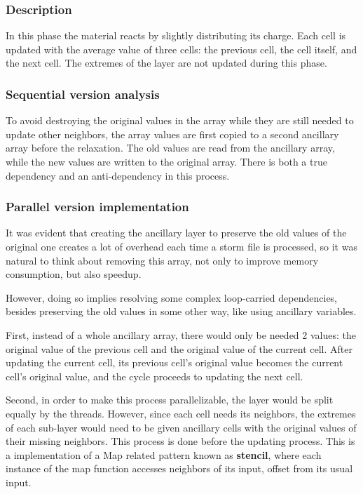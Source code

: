 \subsubsection{Description}

In this phase the material reacts by slightly distributing its charge. Each cell is updated with the average value of three cells: the previous cell, the cell itself, and the next cell. The extremes of the layer are not updated during this phase.

\subsubsection{Sequential version analysis}
To avoid destroying the original values in the array while they are still needed to update other neighbors, the array values are first copied to a second ancillary array before the relaxation. The old values are read from the ancillary array, while the new values are written to the original array.
There is both a true dependency and an anti-dependency in this process.

\subsubsection{Parallel version implementation}

It was evident that creating the ancillary layer to preserve the old values of the original one creates a lot of overhead each time a storm file is processed, so it was natural to think about removing this array, not only to improve memory consumption, but also speedup. 

However, doing so implies resolving some complex loop-carried dependencies, besides preserving the old values in some other way, like using ancillary variables.

First, instead of a whole ancillary array, there would only be needed 2 values: the original value of the previous cell and the original value of the current cell. After updating the current cell, its previous cell's original value becomes the current cell's original value, and the cycle proceeds to updating the next cell.

Second, in order to make this process parallelizable, the layer would be split equally by the threads. However, since each cell needs its neighbors, the extremes of each sub-layer would need to be given ancillary cells with the original values of their missing neighbors. This process is done before the updating process. This is a implementation of a Map related pattern known as \textbf{stencil}, where each instance of the map function accesses neighbors of its input, offset from its usual input.

\par 